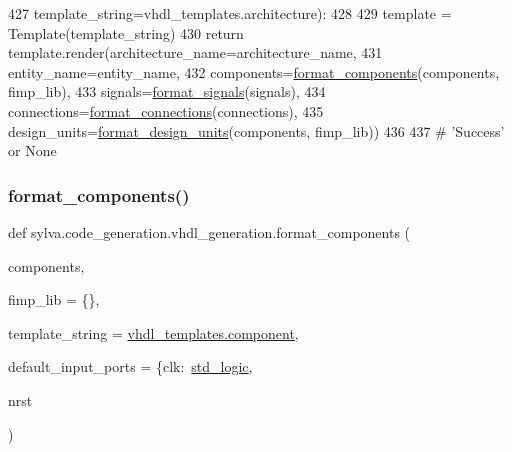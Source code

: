 \begin{DoxyCode}
427                  template\_string=vhdl\_templates.architecture):
428 
429     template = Template(template\_string)
430     \textcolor{keywordflow}{return} template.render(architecture\_name=architecture\_name,
431                            entity\_name=entity\_name,
432                            components=\hyperlink{namespacesylva_1_1code__generation_1_1vhdl__generation_a82d14f967dd9f7e059172186c5b49411}{format\_components}(components, fimp\_lib),
433                            signals=\hyperlink{namespacesylva_1_1code__generation_1_1vhdl__generation_a8d3a2a6fdc4ce4af07672a2dd237a75d}{format\_signals}(signals),
434                            connections=\hyperlink{namespacesylva_1_1code__generation_1_1vhdl__generation_a11710d670da0bd9d0787c3d56fd484c7}{format\_connections}(connections),
435                            design\_units=\hyperlink{namespacesylva_1_1code__generation_1_1vhdl__generation_a220526068f8d3f59852470bc1879f019}{format\_design\_units}(components, fimp\_lib))
436 
437 \textcolor{comment}{# 'Success' or None}
\end{DoxyCode}
\mbox{\label{namespacesylva_1_1code__generation_1_1vhdl__generation_a82d14f967dd9f7e059172186c5b49411}} 
\subsubsection{\texorpdfstring{format\+\_\+components()}{format\_components()}}
{\footnotesize\ttfamily def sylva.\+code\+\_\+generation.\+vhdl\+\_\+generation.\+format\+\_\+components (\begin{DoxyParamCaption}\item[{}]{components,  }\item[{}]{fimp\+\_\+lib = {\ttfamily \{\}},  }\item[{}]{template\+\_\+string = {\ttfamily \hyperlink{namespacesylva_1_1code__generation_1_1vhdl__templates_a65130034af5ea62c012dd84afaedcc34}{vhdl\+\_\+templates.\+component}},  }\item[{}]{default\+\_\+input\+\_\+ports = {\ttfamily \{\textquotesingle{}clk\textquotesingle{}\+:~\textquotesingle{}\hyperlink{namespacesylva_1_1code__generation_1_1vhdl__generation_a85e74939ca684a8a978805b5918467c8}{std\+\_\+logic}\textquotesingle{}},  }\item[{}]{nrst }\end{DoxyParamCaption})}



